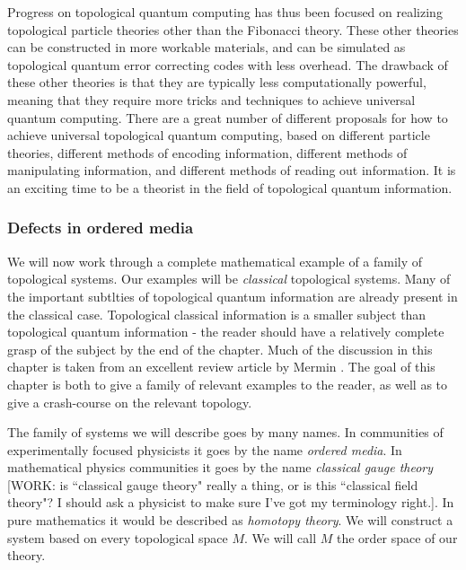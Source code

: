 \documentclass{article}
\theoremstyle{definition}
\numberwithin{figure}{section}
\begin{document}
Progress on topological quantum computing has thus been focused on realizing topological particle theories other than the Fibonacci theory. These other theories can be constructed in more workable materials, and can be simulated as topological quantum error correcting codes with less overhead. The drawback of these other theories is that they are typically less computationally powerful, meaning that they require more tricks and techniques to achieve universal quantum computing. There are a great number of different proposals for how to achieve universal topological quantum computing, based on different particle theories, different methods of encoding information, different methods of manipulating information, and different methods of reading out information. It is an exciting time to be a theorist in the field of topological quantum information.

\subsubsection{Defects in ordered media}

We will now work through a complete mathematical example of a family of topological systems. Our examples will be \textit{classical} topological systems. Many of the important subtlties of topological quantum information are already present in the classical case. Topological classical information is a smaller subject than topological quantum information - the reader should have a relatively complete grasp of the subject by the end of the chapter. Much of the discussion in this chapter is taken from an excellent review article by Mermin \cite{mermin1979topological}. The goal of this chapter is both to give a family of relevant examples to the reader, as well as to give a crash-course on the relevant topology.

The family of systems we will describe goes by many names. In communities of experimentally focused physicists it goes by the name \textit{ordered media}. In mathematical physics communities it goes by the name \textit{classical gauge theory} [WORK: is ``classical gauge theory" really a thing, or is this ``classical field theory"? I should ask a physicist to make sure I've got my terminology right.]. In pure mathematics it would be described as \textit{homotopy theory}. We will construct a system based on every topological space $M$. We will call $M$ the order space of our theory.
\end{document}
